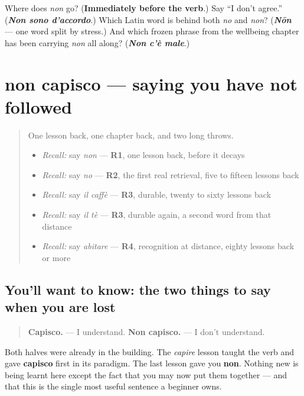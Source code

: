 \begin{tcolorbox}[breakable,colback=teal!4,colframe=teal!35!black,title={Before you move on}]
Where does \emph{non} go? (\textbf{Immediately before the verb}.) Say \textquotedblleft{}I don't agree.\textquotedblright{} (\emph{\textbf{Non sono d'accordo}}.) Which Latin word is behind both \emph{no} and \emph{non}? (\emph{\textbf{Nōn}} — one word split by stress.) And which frozen phrase from the wellbeing chapter has been carrying \emph{non} all along? (\emph{\textbf{Non c'è male}}.)
\end{tcolorbox}
\section[non capisco]{non capisco — saying you have not followed}

\label{lesson:IT-C30-non-capisco}



\begin{quote}
One lesson back, one chapter back, and two long throws.

\begin{itemize}
\raggedright
  \item \emph{Recall:} say \emph{non} — \textbf{R1}, one lesson back, before it decays
  \item \emph{Recall:} say \emph{no} — \textbf{R2}, the first real retrieval, five to fifteen lessons back
  \item \emph{Recall:} say \emph{il caffè} — \textbf{R3}, durable, twenty to sixty lessons back
  \item \emph{Recall:} say \emph{il tè} — \textbf{R3}, durable again, a second word from that distance
  \item \emph{Recall:} say \emph{abitare} — \textbf{R4}, recognition at distance, eighty lessons back or more
\end{itemize}
\end{quote}

\subsection*{You'll want to know: the two things to say when you are lost}
\begin{quote}
\textbf{Capisco.} — I understand. \textbf{Non capisco.} — I don't understand.
\end{quote}

Both halves were already in the building. The \emph{capire} lesson taught the verb and gave \textbf{capisco} first in its paradigm. The last lesson gave you \textbf{non}. Nothing new is being learnt here except the fact that you may now put them together — and that this is the single most useful sentence a beginner owns.

